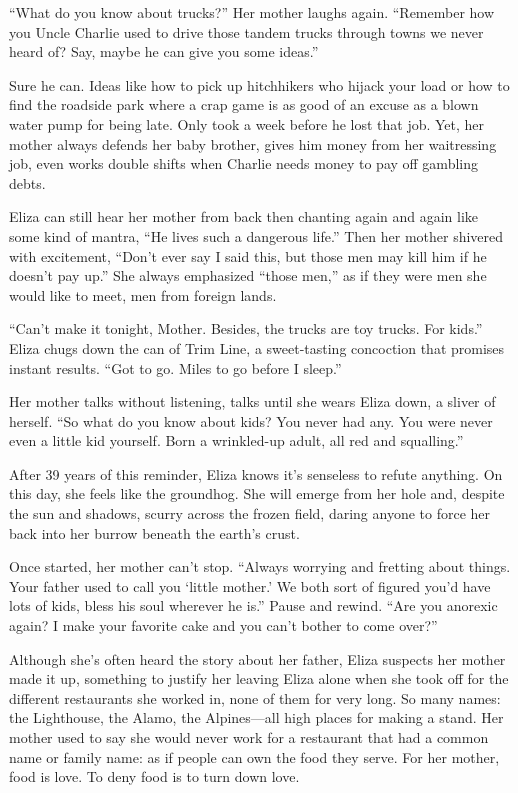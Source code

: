 \documentclass[
]{article}
\begin{document}
``What do you know about trucks?'' Her mother laughs again. ``Remember
how you Uncle Charlie used to drive those tandem trucks through towns we
never heard of? Say, maybe he can give you some ideas.''

Sure he can. Ideas like how to pick up hitchhikers who hijack your load
or how to find the roadside park where a crap game is as good of an
excuse as a blown water pump for being late. Only took a week before he
lost that job. Yet, her mother always defends her baby brother, gives
him money from her waitressing job, even works double shifts when
Charlie needs money to pay off gam­bling debts.

Eliza can still hear her mother from back then chanting again and again
like some kind of mantra, ``He lives such a dangerous life.'' Then her
mother shivered with excitement, ``Don't ever say I said this, but those
men may kill him if he doesn't pay up.'' She always emphasized ``those
men,'' as if they were men she would like to meet, men from foreign
lands.

``Can't make it tonight, Mother. Besides, the trucks are toy trucks. For
kids.'' Eliza chugs down the can of Trim Line, a sweet-tasting
concoction that promises instant results. ``Got to go. Miles to go
before I sleep.''

Her mother talks without listening, talks until she wears Eliza down, a
sliver of herself. ``So what do you know about kids? You never had any.
You were never even a little kid yourself. Born a wrinkled-up adult, all
red and squalling.''

After 39 years of this reminder, Eliza knows it's senseless to refute
anything. On this day, she feels like the groundhog. She will emerge
from her hole and, despite the sun and shadows, scurry across the frozen
field, daring anyone to force her back into her burrow beneath the
earth's crust.

Once started, her mother can't stop. ``Always worrying and fretting
about things. Your father used to call you `little mother.' We both sort
of figured you'd have lots of kids, bless his soul wherever he is.''
Pause and rewind. ``Are you anorexic again? I make your favorite cake
and you can't bother to come over?''

Although she's often heard the story about her father, Eliza suspects
her mother made it up, something to justify her leaving Eliza alone when
she took off for the different restaurants she worked in, none of them
for very long. So many names: the Lighthouse, the Alamo, the
Alpines---all high places for making a stand. Her mother used to say she
would never work for a restaurant that had a common name or family name:
as if people can own the food they serve. For her mother, food is love.
To deny food is to turn down love.
\end{document}
